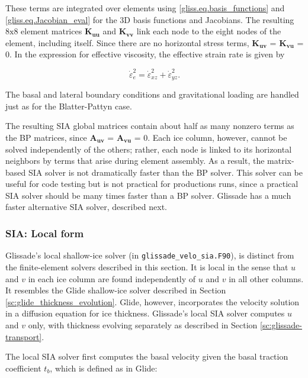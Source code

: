 {\noindent
These terms are integrated over elements using \eqref{gliss.eq.basis_functions}
and \eqref{gliss.eq.Jacobian_eval} for the 3D basis functions and Jacobians.
The resulting $8\text{x}8$ element matrices $\mathbf{K_{uu}}$ and $\mathbf{K_{vv}}$ link each node
to the eight nodes of the element, including itself.  Since there are no
horizontal stress terms, $\mathbf{K_{uv}}$ = $\mathbf{K_{vu}}$ = 0. In the expression for
effective viscosity, the effective strain rate is given by

\begin{equation}
  \label{gliss.eq.effective_strain_rate_sia}
        {\dot{\varepsilon }}^{2}_{e} = {\dot{\varepsilon }}^{2}_{xz} + {\dot{\varepsilon }}^{2}_{yz}.
\end{equation}

\noindent
The basal and lateral boundary conditions and gravitational loading are handled
just as for the Blatter-Pattyn case.

The resulting SIA global matrices contain about half as many nonzero terms as the BP matrices,
since $\mathbf{A_{uv}}$ = $\mathbf{A_{vu}}$ = 0.  Each ice column, however, cannot be solved independently of the others;
rather, each node is linked to its horizontal neighbors by terms that arise during
element assembly.  As a result, the matrix-based SIA solver is not dramatically faster than the BP solver.
This solver can be useful for code testing
but is not practical for productions runs, since a practical SIA solver should be many times
faster than a BP solver.  Glissade has a much faster alternative SIA solver,
described next.

\subsubsection{SIA: Local form}

Glissade's local shallow-ice solver (in \texttt{glissade\_velo\_sia.F90}),
is distinct from the finite-element solvers described in this section.
It is local in the sense that $u$ and $v$ in each ice column are found independently
of $u$ and $v$ in all other columns.
It resembles the Glide shallow-ice solver described in Section \ref{sc:glide_thickness_evolution}.
Glide, however, incorporates the velocity solution in a diffusion equation for ice thickness.
Glissade's local SIA solver computes $u$ and $v$ only, with
thickness evolving separately as described in Section \ref{sc:glissade-transport}.

The local SIA solver first computes the basal velocity given the basal traction coefficient $t_b$,
which is defined as in Glide:

}
